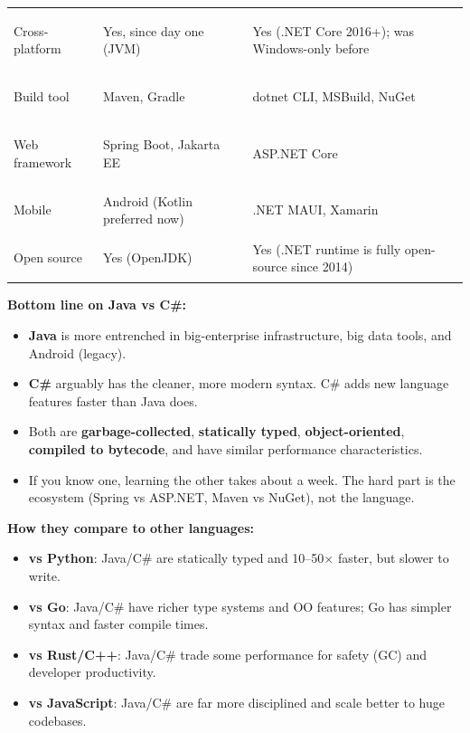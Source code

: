 \documentclass[11pt, letterpaper]{article}
\begin{document}
{\begin{tabularx}{\textwidth}{>{\bfseries\raggedright\arraybackslash}p{3.2cm}
                              >{\raggedright\arraybackslash}X
                              >{\raggedright\arraybackslash}X}
\rowcolor{rowB}  Cross-platform  & Yes, since day one (JVM)           & Yes (.NET Core 2016+); was Windows-only before \\
\rowcolor{rowA}  Build tool      & Maven, Gradle                      & dotnet CLI, MSBuild, NuGet \\
\rowcolor{rowB}  Web framework   & Spring Boot, Jakarta EE            & ASP.NET Core \\
\rowcolor{rowA}  Mobile          & Android (Kotlin preferred now)     & .NET MAUI, Xamarin \\
\rowcolor{rowB}  Open source     & Yes (OpenJDK)                       & Yes (.NET runtime is fully open-source since 2014) \\
\bottomrule
\end{tabularx}}

\begin{tcolorbox}[colback=partbg, colframe=sectionblue, arc=3pt, boxrule=1pt]
\textbf{Bottom line on Java vs C\#:}
\begin{itemize}[noitemsep, leftmargin=*]
  \item \textbf{Java} is more entrenched in big-enterprise infrastructure, big data tools, and Android (legacy).
  \item \textbf{C\#} arguably has the cleaner, more modern syntax. C\# adds new language features faster than Java does.
  \item Both are \textbf{garbage-collected}, \textbf{statically typed}, \textbf{object-oriented}, \textbf{compiled to bytecode}, and have similar performance characteristics.
  \item If you know one, learning the other takes about a week. The hard part is the ecosystem (Spring vs ASP.NET, Maven vs NuGet), not the language.
\end{itemize}
\end{tcolorbox}

\textbf{How they compare to other languages:}
\begin{itemize}[noitemsep]
  \item \textbf{vs Python}: Java/C\# are statically typed and 10--50$\times$ faster, but slower to write.
  \item \textbf{vs Go}: Java/C\# have richer type systems and OO features; Go has simpler syntax and faster compile times.
  \item \textbf{vs Rust/C++}: Java/C\# trade some performance for safety (GC) and developer productivity.
  \item \textbf{vs JavaScript}: Java/C\# are far more disciplined and scale better to huge codebases.
\end{itemize}
\end{document}

